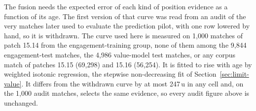The fusion needs the expected error of each kind of position evidence as a function of its age. The first
version of that curve was read from an audit of the very matches later used to evaluate the prediction
pilot, with one row lowered by hand, so it is withdrawn. The curve used here is measured on 1,000 matches
of patch 15.14 from the engagement-training group, none of them among the 9,844 engagement-test matches,
the 4,986 value-model test matches, or any corpus match of patches 15.15 (69,298) and 15.16 (56,254). It
is fitted to rise with age by weighted isotonic regression, the stepwise non-decreasing fit of
Section~\ref{sec:limit-value}. It differs from the withdrawn curve by at most
247\,u in any cell and, on the 1,000 audit matches, selects the same evidence, so every audit figure above
is unchanged.


